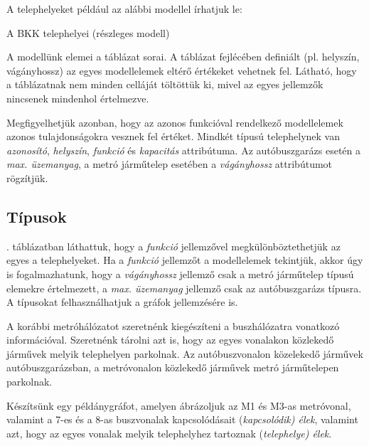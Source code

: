 A telephelyeket például az alábbi modellel írhatjuk le:

\begin{table}[H]
	\centering
	
	\caption{A BKK telephelyei (részleges modell)}
	\label{tab:jarmutelepek}
\end{table}

A modellünk elemei a táblázat sorai. A táblázat fejlécében definiált  (pl. helyszín, vágányhossz) az egyes modellelemek eltérő értékeket vehetnek fel. Látható, hogy a táblázatnak nem minden celláját töltöttük ki, mivel az egyes jellemzők nincsenek mindenhol értelmezve.

Megfigyelhetjük azonban, hogy az azonos %
funkcióval rendelkező modellelemek azonos tulajdonságokra vesznek fel értéket.
Mindkét típusú telephelynek van \textit{azonosító}, \textit{helyszín}, \textit{funkció} és \textit{kapacitás} attribútuma. Az \textsf{autóbuszgarázs} esetén a \textit{max. üzemanyag}, a \textsf{metró járműtelep} esetében a \textit{vágányhossz} attribútumot rögzítjük.

\subsection{Típusok}

. táblázatban láthattuk, hogy a \textit{funkció} jellemzővel megkülönböztethetjük az egyes a telephelyeket. Ha a \textit{funkció} jellemzőt a modellelemek  tekintjük, akkor úgy is fogalmazhatunk, hogy a \textit{vágányhossz} jellemző csak a \textsf{metró járműtelep} típusú elemekre értelmezett, a \textit{max. üzemanyag} jellemző csak az \textsf{autóbuszgarázs} típusra. A típusokat felhasználhatjuk a gráfok jellemzésére is.

\begin{pelda}
	A korábbi metróhálózatot szeretnénk kiegészíteni a buszhálózatra vonatkozó információval. Szeretnénk tárolni azt is, hogy az egyes vonalakon közlekedő járművek melyik telephelyen parkolnak. Az autóbuszvonalon közelekedő járművek autóbuszgarázsban, a metróvonalon közlekedő járművek metró járműtelepen parkolnak.
\end{pelda}

Készítsünk egy példánygráfot, amelyen ábrázoljuk az M1 és M3-as metróvonal, valamint a 7-es és a 8-as buszvonalak kapcsolódásait (\textit{kapcsolódik) élek}, valamint azt, hogy az egyes vonalak melyik telephelyhez tartoznak (\textit{telephelye) élek}.

